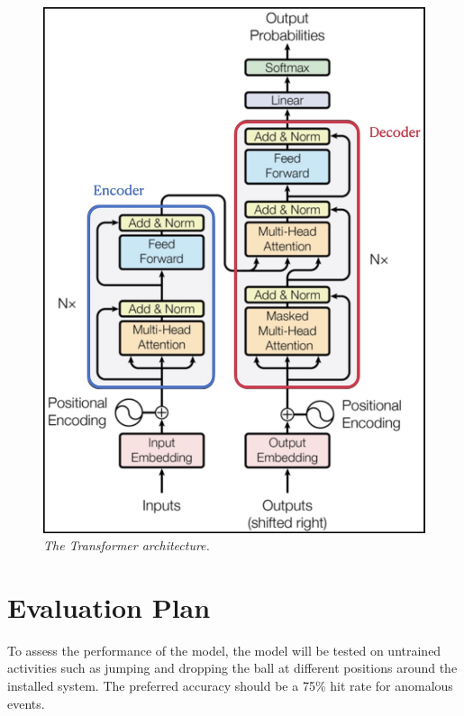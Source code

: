 \begin{figure}[H]
  \centering
  \caption[The Transformer architecture.]{\emph{The Transformer architecture. \\}}\label{fig:transformer_metho}
  \includegraphics[scale = 0.22]{figures/transformer_metho.jpg}
\end{figure}

\section{Evaluation Plan}

To assess the performance of the model, the model will be tested on untrained activities such as jumping and dropping the ball at different positions around the installed system. The preferred accuracy should be a 75\% hit rate for anomalous events. 

\FloatBarrier